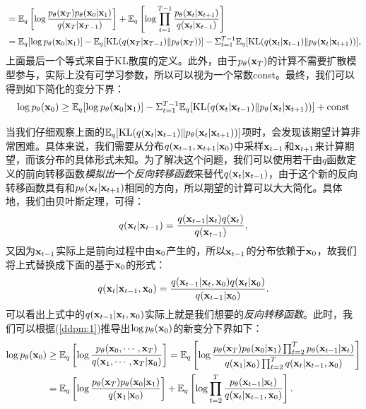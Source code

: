 \documentclass[11pt,a4paper,UTF8]{ctexart}
\begin{document}
\begin{appendices}
\begin{align}
\begin{split}
    &= \mathbb{E}_q\left[\log\frac{p_{\theta}(\mathbf{x}_T)p_{\theta}(\mathbf{x}_0|\mathbf{x}_1)}{q(\mathbf{x}_T|\mathbf{x}_{T-1})} \right] + \mathbb{E}_q\left[\log\prod_{t=1}^{T-1}\frac{p_{\theta}(\mathbf{x}_{t}|\mathbf{x}_{t+1})}{q(\mathbf{x}_t|\mathbf{x}_{t-1})} \right] \\
    &= \mathbb{E}_q[\log p_{\theta}(\mathbf{x}_0|\mathbf{x}_1)] - \mathbb{E}_q[\text{KL}(q(\mathbf{x}_T|\mathbf{x}_{T-1}) \| p_{\theta}(\mathbf{x}_T))] -\Sigma_{t=1}^{T-1}\mathbb{E}_q[\text{KL}(q(\mathbf{x}_t|\mathbf{x}_{t-1}) \| p_{\theta}(\mathbf{x}_{t}|\mathbf{x}_{t+1}))],
\end{split}
\label{ddpm:2}
\end{align}
上面最后一个等式来自于KL散度的定义。此外，由于$p_{\theta}(\mathbf{x}_T)$的计算不需要扩散模型参与，实际上没有可学习参数，所以可以视为一个常数const。最终，我们可以得到如下简化的变分下界：
\begin{equation}
\log p_{\theta}(\mathbf{x}_0) \geq \mathbb{E}_q[\log p_{\theta}(\mathbf{x}_0|\mathbf{x}_1)]  -\Sigma_{t=1}^{T-1}\mathbb{E}_q[\text{KL}(q(\mathbf{x}_t|\mathbf{x}_{t-1}) \| p_{\theta}(\mathbf{x}_{t}|\mathbf{x}_{t+1}))] + \text{const}
\label{ddpm:elbo_old}
\end{equation}

当我们仔细观察上面的$\mathbb{E}_q[\text{KL}(q(\mathbf{x}_t|\mathbf{x}_{t-1}) \| p_{\theta}(\mathbf{x}_{t}|\mathbf{x}_{t+1}))]$项时，会发现该期望计算非常困难。具体来说，我们需要从分布$q(\mathbf{x}_{t-1},\mathbf{x}_{t+1}|\mathbf{x}_0)$中采样$\mathbf{x}_{t-1}$和$\mathbf{x}_{t+1}$来计算期望，而该分布的具体形式未知。为了解决这个问题，我们可以使用若干由$q$函数定义的前向转移函数\emph{模拟出}一个\emph{反向转移函数}来替代$q(\mathbf{x}_t|\mathbf{x}_{t-1})$，由于这个新的反向转移函数具有和$p_{\theta}(\mathbf{x}_t|\mathbf{x}_{t+1})$相同的方向，所以期望的计算可以大大简化。具体地，我们由贝叶斯定理，可得：
\begin{equation*}
    q(\mathbf{x}_t|\mathbf{x}_{t-1})=\frac{q(\mathbf{x}_{t-1}|\mathbf{x}_t)q(\mathbf{x}_t)}{q(\mathbf{x}_{t-1})},
\end{equation*}
又因为$\mathbf{x}_{t-1}$实际上是前向过程中由$\mathbf{x}_0$产生的，所以$\mathbf{x}_{t-1}$的分布依赖于$\mathbf{x}_0$，故我们将上式替换成下面的基于$\mathbf{x}_0$的形式：
\begin{equation}
    q(\mathbf{x}_t|\mathbf{x}_{t-1},\mathbf{x}_0)=\frac{q(\mathbf{x}_{t-1}|\mathbf{x}_t,\mathbf{x}_0)q(\mathbf{x}_t|\mathbf{x}_0)}{q(\mathbf{x}_{t-1}|\mathbf{x}_0)}.
\label{ddpm:bayes}
\end{equation}
可以看出上式中的$q(\mathbf{x}_{t-1}|\mathbf{x}_t,\mathbf{x}_0)$实际上就是我们想要的\emph{反向转移函数}。此时，我们可以根据(\ref{ddpm:1})推导出$\log p_{\theta}(\mathbf{x}_0)$的新变分下界如下：
\begin{align}
\begin{split}
    \log p_{\theta}(\mathbf{x}_0) & \geq \mathbb{E}_q \left[\log \frac{p_{\theta}(\mathbf{x}_0,\cdots,\mathbf{x}_T)}{q(\mathbf{x}_1,\cdots,\mathbf{x}_T|\mathbf{x}_0)}\right]= \mathbb{E}_q \left[\log\frac{p_{\theta}(\mathbf{x}_T)p_{\theta}(\mathbf{x}_0|\mathbf{x}_1)\prod_{t=2}^T p_{\theta}(\mathbf{x}_{t-1}|\mathbf{x}_t)}{q(\mathbf{x}_1|\mathbf{x}_0)\prod_{t=2}^T q(\mathbf{x}_t|\mathbf{x}_{t-1},\mathbf{x}_0)} \right] \\
    &= \mathbb{E}_q \left[\log\frac{p_{\theta}(\mathbf{x}_T)p_{\theta}(\mathbf{x}_0|\mathbf{x}_1)}{q(\mathbf{x}_1|\mathbf{x}_0)} \right] + \mathbb{E}_q \left[\log \prod_{t=2}^T \frac{p_{\theta}(\mathbf{x}_{t-1}|\mathbf{x}_t)}{q(\mathbf{x}_t|\mathbf{x}_{t-1},\mathbf{x}_0)} \right].
\end{split}
\label{ddpm:3}
\end{align}


\end{appendices}
\end{document}
